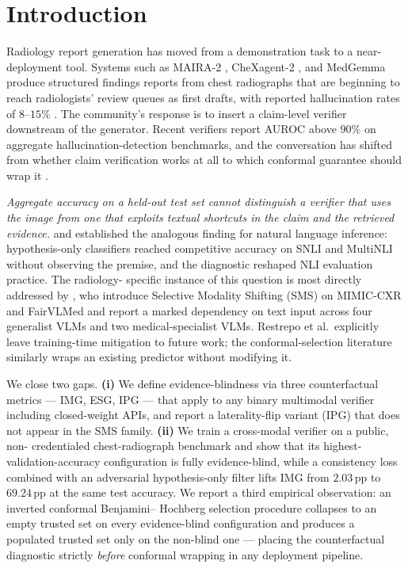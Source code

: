 \documentclass{article}
\begin{document}
\section{Introduction}
\label{sec:intro}

Radiology report generation has moved from a demonstration task to a
near-deployment tool. Systems such as MAIRA-2
\citep{bannur2024maira2}, CheXagent-2 \citep{chen2024chexagent}, and
MedGemma \citep{google2024medgemma} produce structured findings reports
from chest radiographs that are beginning to reach radiologists' review
queues as first drafts, with reported hallucination rates of $8$--$15\%$
\citep{zhang2025radflag,hardy2025rextrust}. The community's response is
to insert a claim-level verifier downstream of the generator. Recent
verifiers report AUROC above $90\%$ on aggregate hallucination-detection
benchmarks, and the conversation has shifted from whether claim
verification works at all to which conformal guarantee should wrap it
\citep{mohri2024conformal, angelopoulos2021gentle, gui2024conformal,
li2025conflvlm}.

\emph{Aggregate accuracy on a held-out test set cannot distinguish a
verifier that uses the image from one that exploits textual shortcuts in
the claim and the retrieved evidence.} \citet{gururangan2018annotation}
and \citet{poliak2018hypothesis} established the analogous finding for
natural language inference: hypothesis-only classifiers reached
competitive accuracy on SNLI and MultiNLI without observing the premise,
and the diagnostic reshaped NLI evaluation practice. The radiology-
specific instance of this question is most directly addressed by
\citet{restrepo2025sms}, who introduce Selective Modality Shifting (SMS)
on MIMIC-CXR and FairVLMed and report a marked dependency on text input
across four generalist VLMs and two medical-specialist VLMs. Restrepo
et al.\ explicitly leave training-time mitigation to future work; the
conformal-selection literature similarly wraps an existing predictor
without modifying it.

We close two gaps. \textbf{(i)} We define evidence-blindness via three
counterfactual metrics --- IMG, ESG, IPG --- that apply to any binary
multimodal verifier including closed-weight APIs, and report a
laterality-flip variant (IPG) that does not appear in the SMS family.
\textbf{(ii)} We train a cross-modal verifier on a public, non-
credentialed chest-radiograph benchmark and show that its highest-
validation-accuracy configuration is fully evidence-blind, while a
consistency loss combined with an adversarial hypothesis-only filter
lifts IMG from $2.03$\,pp to $69.24$\,pp at the same test accuracy. We
report a third empirical observation: an inverted conformal Benjamini--
Hochberg selection procedure collapses to an empty trusted set on every
evidence-blind configuration and produces a populated trusted set only on
the non-blind one --- placing the counterfactual diagnostic strictly
\emph{before} conformal wrapping in any deployment pipeline.
\end{document}
